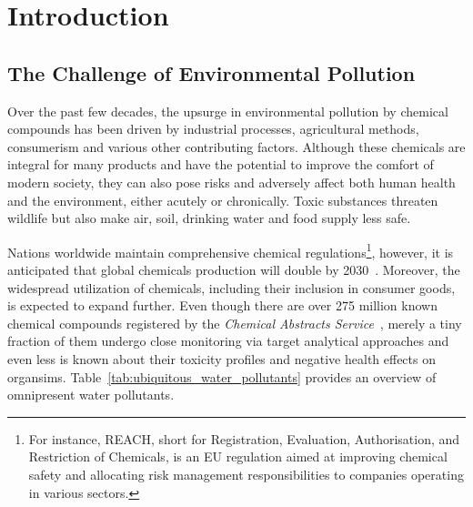 \chapter{Introduction}\label{chap:introduction}

\section{The Challenge of Environmental Pollution}

Over the past few decades, the upsurge in environmental pollution by chemical compounds has been driven by industrial processes, agricultural methods, consumerism and various other contributing factors. Although these chemicals are integral for many products and have the potential to improve the comfort of modern society, they can also pose risks and adversely affect both human health and the environment, either acutely or chronically. Toxic substances threaten wildlife but also make air, soil, drinking water and food supply less safe. 

Nations worldwide maintain comprehensive chemical regulations\footnote{For instance, REACH, short for Registration, Evaluation, Authorisation, and Restriction of Chemicals, is an EU regulation aimed at improving chemical safety and allocating risk management responsibilities to companies operating in various sectors.}, however, it is anticipated that global chemicals production will double by 2030~\cite{chemicaloutlook}. Moreover, the widespread utilization of chemicals, including their inclusion in consumer goods, is expected to expand further.
Even though there are over 275 million known chemical compounds registered by the \emph{Chemical Abstracts Service}~\cite{CAS}, merely a tiny fraction of them undergo close monitoring via target analytical approaches and even less is known about their toxicity profiles and negative health effects on organsims. Table~\ref{tab:ubiquitous_water_pollutants} provides an overview of omnipresent water pollutants.

